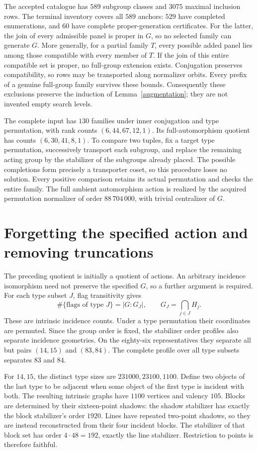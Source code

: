 The accepted catalogue has $589$ subgroup classes and $3075$ maximal
inclusion rows. The terminal inventory covers all $589$ anchors:
$529$ have completed enumerations, and $60$ have complete proper-generation
certificates. For the latter, the join of every admissible panel is
proper in $G$, so no selected family can generate $G$. More generally,
for a partial family $T$, every possible added panel lies among those
compatible with every member of $T$. If the join of this entire compatible
set is proper, no full-group extension exists. Conjugation preserves
compatibility, so rows may be transported along normalizer orbits.
Every prefix of a genuine full-group family survives these bounds.
Consequently these exclusions preserve the induction of
Lemma~\ref{augmentation}; they are not invented empty search levels.

The complete input has $130$ families under inner conjugation and type
permutation, with rank counts $(6,44,67,12,1)$. Its full-automorphism
quotient has counts $(6,30,41,8,1)$. To compare two tuples, fix a target
type permutation, successively transport each subgroup, and replace
the remaining acting group by the stabilizer of the subgroups already
placed. The possible completions form precisely a transporter coset,
so this procedure loses no solution. Every positive comparison retains
its actual permutation and checks the entire family. The full ambient
automorphism action is realized by the acquired permutation normalizer
of order $88\,704\,000$, with trivial centralizer of $G$.

\section{Forgetting the specified action and removing truncations}
The preceding quotient is initially a quotient of actions. An arbitrary
incidence isomorphism need not preserve the specified $G$, so a further
argument is required. For each type subset $J$, flag transitivity gives
\[
       \#\{\text{flags of type }J\}=|G:G_J|,
       \qquad G_J=\bigcap_{j\in J}H_j.
\]
These are intrinsic incidence counts. Under a type permutation their
coordinates are permuted. Since the group order is fixed, the stabilizer
order profiles also separate incidence geometries. On the eighty-six
representatives they separate all but pairs $(14,15)$ and $(83,84)$.
The complete profile over all type subsets separates $83$ and $84$.

For $14,15$, the distinct type sizes are $231000,23100,1100$. Define
two objects of the last type to be adjacent when some object of the
first type is incident with both. The resulting intrinsic graphs have
$1100$ vertices and valency $105$. Blocks are determined by their
sixteen-point shadows: the shadow stabilizer has exactly the block
stabilizer's order $1920$. Lines have repeated two-point shadows, so
they are instead reconstructed from their four incident blocks. The
stabilizer of that block set has order $4\cdot48=192$, exactly the
line stabilizer. Restriction to points is therefore faithful.

